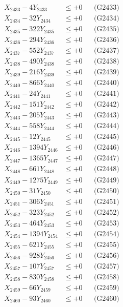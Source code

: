 \documentclass[a4paper,10pt]{article}
\begin{document}
{\begin{align}
X_{2433} - 4Y_{2433} &\leq +0 && \text{(G2433)} \\
X_{2434} - 32Y_{2434} &\leq +0 && \text{(G2434)} \\
X_{2435} - 322Y_{2435} &\leq +0 && \text{(G2435)} \\
X_{2436} - 294Y_{2436} &\leq +0 && \text{(G2436)} \\
X_{2437} - 552Y_{2437} &\leq +0 && \text{(G2437)} \\
X_{2438} - 490Y_{2438} &\leq +0 && \text{(G2438)} \\
X_{2439} - 216Y_{2439} &\leq +0 && \text{(G2439)} \\
X_{2440} - 866Y_{2440} &\leq +0 && \text{(G2440)} \\
\allowbreak
X_{2441} - 24Y_{2441} &\leq +0 && \text{(G2441)} \\
X_{2442} - 151Y_{2442} &\leq +0 && \text{(G2442)} \\
X_{2443} - 205Y_{2443} &\leq +0 && \text{(G2443)} \\
X_{2444} - 558Y_{2444} &\leq +0 && \text{(G2444)} \\
X_{2445} - 12Y_{2445} &\leq +0 && \text{(G2445)} \\
X_{2446} - 1394Y_{2446} &\leq +0 && \text{(G2446)} \\
X_{2447} - 1365Y_{2447} &\leq +0 && \text{(G2447)} \\
X_{2448} - 661Y_{2448} &\leq +0 && \text{(G2448)} \\
X_{2449} - 1275Y_{2449} &\leq +0 && \text{(G2449)} \\
X_{2450} - 31Y_{2450} &\leq +0 && \text{(G2450)} \\
\allowbreak
X_{2451} - 306Y_{2451} &\leq +0 && \text{(G2451)} \\
X_{2452} - 323Y_{2452} &\leq +0 && \text{(G2452)} \\
X_{2453} - 464Y_{2453} &\leq +0 && \text{(G2453)} \\
X_{2454} - 1394Y_{2454} &\leq +0 && \text{(G2454)} \\
X_{2455} - 621Y_{2455} &\leq +0 && \text{(G2455)} \\
X_{2456} - 928Y_{2456} &\leq +0 && \text{(G2456)} \\
X_{2457} - 107Y_{2457} &\leq +0 && \text{(G2457)} \\
X_{2458} - 830Y_{2458} &\leq +0 && \text{(G2458)} \\
X_{2459} - 66Y_{2459} &\leq +0 && \text{(G2459)} \\
X_{2460} - 93Y_{2460} &\leq +0 && \text{(G2460)} \\

\end{align}}
\end{document}
